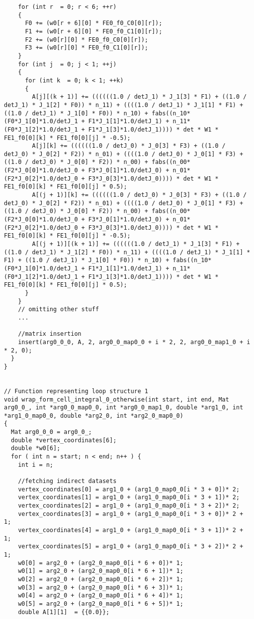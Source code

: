 \documentclass[a4paper]{article}
\begin{document}
\begin{appendices}
\begin{lstlisting}
    for (int r  = 0; r < 6; ++r)
    {
      F0 += (w0[r + 6][0] * FE0_f0_C0[0][r]);
      F1 += (w0[r + 6][0] * FE0_f0_C1[0][r]);
      F2 += (w0[r][0] * FE0_f0_C0[0][r]);
      F3 += (w0[r][0] * FE0_f0_C1[0][r]);      
    }
    for (int j  = 0; j < 1; ++j)
    {
      for (int k  = 0; k < 1; ++k)
      {
        A[j][(k + 1)] += ((((((1.0 / detJ_1) * J_1[3] * F1) + ((1.0 / detJ_1) * J_1[2] * F0)) * n_11) + ((((1.0 / detJ_1) * J_1[1] * F1) + ((1.0 / detJ_1) * J_1[0] * F0)) * n_10) + fabs((n_10*(F0*J_1[0]*1.0/detJ_1 + F1*J_1[1]*1.0/detJ_1) + n_11*(F0*J_1[2]*1.0/detJ_1 + F1*J_1[3]*1.0/detJ_1)))) * det * W1 * FE1_f0[0][k] * FE1_f0[0][j] * -0.5);
        A[j][k] += ((((((1.0 / detJ_0) * J_0[3] * F3) + ((1.0 / detJ_0) * J_0[2] * F2)) * n_01) + ((((1.0 / detJ_0) * J_0[1] * F3) + ((1.0 / detJ_0) * J_0[0] * F2)) * n_00) + fabs((n_00*(F2*J_0[0]*1.0/detJ_0 + F3*J_0[1]*1.0/detJ_0) + n_01*(F2*J_0[2]*1.0/detJ_0 + F3*J_0[3]*1.0/detJ_0)))) * det * W1 * FE1_f0[0][k] * FE1_f0[0][j] * 0.5);
        A[(j + 1)][k] += ((((((1.0 / detJ_0) * J_0[3] * F3) + ((1.0 / detJ_0) * J_0[2] * F2)) * n_01) + ((((1.0 / detJ_0) * J_0[1] * F3) + ((1.0 / detJ_0) * J_0[0] * F2)) * n_00) + fabs((n_00*(F2*J_0[0]*1.0/detJ_0 + F3*J_0[1]*1.0/detJ_0) + n_01*(F2*J_0[2]*1.0/detJ_0 + F3*J_0[3]*1.0/detJ_0)))) * det * W1 * FE1_f0[0][k] * FE1_f0[0][j] * -0.5);
        A[(j + 1)][(k + 1)] += ((((((1.0 / detJ_1) * J_1[3] * F1) + ((1.0 / detJ_1) * J_1[2] * F0)) * n_11) + ((((1.0 / detJ_1) * J_1[1] * F1) + ((1.0 / detJ_1) * J_1[0] * F0)) * n_10) + fabs((n_10*(F0*J_1[0]*1.0/detJ_1 + F1*J_1[1]*1.0/detJ_1) + n_11*(F0*J_1[2]*1.0/detJ_1 + F1*J_1[3]*1.0/detJ_1)))) * det * W1 * FE1_f0[0][k] * FE1_f0[0][j] * 0.5);        
      }      
    }
    // omitting other stuff
    ...
    
    //matrix insertion
    insert(arg0_0_0, A, 2, arg0_0_map0_0 + i * 2, 2, arg0_0_map1_0 + i * 2, 0);
  }
}


// Function representing loop structure 1
void wrap_form_cell_integral_0_otherwise(int start, int end, Mat arg0_0_, int *arg0_0_map0_0, int *arg0_0_map1_0, double *arg1_0, int *arg1_0_map0_0, double *arg2_0, int *arg2_0_map0_0) 
{
  Mat arg0_0_0 = arg0_0_;
  double *vertex_coordinates[6];
  double *w0[6];
  for ( int n = start; n < end; n++ ) {
    int i = n;
    
    //fetching indirect datasets
    vertex_coordinates[0] = arg1_0 + (arg1_0_map0_0[i * 3 + 0])* 2;
    vertex_coordinates[1] = arg1_0 + (arg1_0_map0_0[i * 3 + 1])* 2;
    vertex_coordinates[2] = arg1_0 + (arg1_0_map0_0[i * 3 + 2])* 2;
    vertex_coordinates[3] = arg1_0 + (arg1_0_map0_0[i * 3 + 0])* 2 + 1;
    vertex_coordinates[4] = arg1_0 + (arg1_0_map0_0[i * 3 + 1])* 2 + 1;
    vertex_coordinates[5] = arg1_0 + (arg1_0_map0_0[i * 3 + 2])* 2 + 1;
    w0[0] = arg2_0 + (arg2_0_map0_0[i * 6 + 0])* 1;
    w0[1] = arg2_0 + (arg2_0_map0_0[i * 6 + 1])* 1;
    w0[2] = arg2_0 + (arg2_0_map0_0[i * 6 + 2])* 1;
    w0[3] = arg2_0 + (arg2_0_map0_0[i * 6 + 3])* 1;
    w0[4] = arg2_0 + (arg2_0_map0_0[i * 6 + 4])* 1;
    w0[5] = arg2_0 + (arg2_0_map0_0[i * 6 + 5])* 1;
    double A[1][1]  = {{0.0}};


\end{lstlisting}
\end{appendices}
\end{document}
